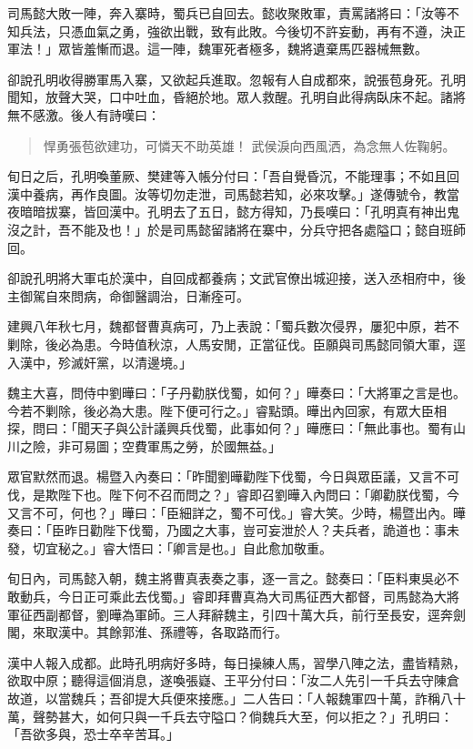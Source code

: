 司馬懿大敗一陣，奔入寨時，蜀兵已自回去。懿收聚敗軍，責罵諸將曰：「汝等不知兵法，只憑血氣之勇，強欲出戰，致有此敗。今後切不許妄動，再有不遵，決正軍法！」眾皆羞慚而退。這一陣，魏軍死者極多，魏將遺棄馬匹器械無數。

卻說孔明收得勝軍馬入寨，又欲起兵進取。忽報有人自成都來，說張苞身死。孔明聞知，放聲大哭，口中吐血，昏絕於地。眾人救醒。孔明自此得病臥床不起。諸將無不感激。後人有詩嘆曰：

\begin{quote}
悍勇張苞欲建功，可憐天不助英雄！
武侯淚向西風洒，為念無人佐鞠躬。
\end{quote}

旬日之后，孔明喚董厥、樊建等入帳分付曰：「吾自覺昏沉，不能理事；不如且回漢中養病，再作良圖。汝等切勿走泄，司馬懿若知，必來攻擊。」遂傳號令，教當夜暗暗拔寨，皆回漢中。孔明去了五日，懿方得知，乃長嘆曰：「孔明真有神出鬼沒之計，吾不能及也！」於是司馬懿留諸將在寨中，分兵守把各處隘口；懿自班師回。

卻說孔明將大軍屯於漢中，自回成都養病；文武官僚出城迎接，送入丞相府中，後主御駕自來問病，命御醫調治，日漸痊可。

建興八年秋七月，魏都督曹真病可，乃上表說：「蜀兵數次侵界，屢犯中原，若不剿除，後必為患。今時值秋涼，人馬安閒，正當征伐。臣願與司馬懿同領大軍，逕入漢中，殄滅奸黨，以清邊境。」

魏主大喜，問侍中劉曄曰：「子丹勸朕伐蜀，如何？」曄奏曰：「大將軍之言是也。今若不剿除，後必為大患。陛下便可行之。」睿點頭。曄出內回家，有眾大臣相探，問曰：「聞天子與公計議興兵伐蜀，此事如何？」曄應曰：「無此事也。蜀有山川之險，非可易圖；空費軍馬之勞，於國無益。」

眾官默然而退。楊暨入內奏曰：「昨聞劉曄勸陛下伐蜀，今日與眾臣議，又言不可伐，是欺陛下也。陛下何不召而問之？」睿即召劉曄入內問曰：「卿勸朕伐蜀，今又言不可，何也？」曄曰：「臣細詳之，蜀不可伐。」睿大笑。少時，楊暨出內。曄奏曰：「臣昨日勸陛下伐蜀，乃國之大事，豈可妄泄於人？夫兵者，詭道也：事未發，切宜秘之。」睿大悟曰：「卿言是也。」自此愈加敬重。

旬日內，司馬懿入朝，魏主將曹真表奏之事，逐一言之。懿奏曰：「臣料東吳必不敢動兵，今日正可乘此去伐蜀。」睿即拜曹真為大司馬征西大都督，司馬懿為大將軍征西副都督，劉曄為軍師。三人拜辭魏主，引四十萬大兵，前行至長安，逕奔劍閣，來取漢中。其餘郭淮、孫禮等，各取路而行。

漢中人報入成都。此時孔明病好多時，每日操練人馬，習學八陣之法，盡皆精熟，欲取中原；聽得這個消息，遂喚張嶷、王平分付曰：「汝二人先引一千兵去守陳倉故道，以當魏兵；吾卻提大兵便來接應。」二人告曰：「人報魏軍四十萬，詐稱八十萬，聲勢甚大，如何只與一千兵去守隘口？倘魏兵大至，何以拒之？」孔明曰：「吾欲多與，恐士卒辛苦耳。」


